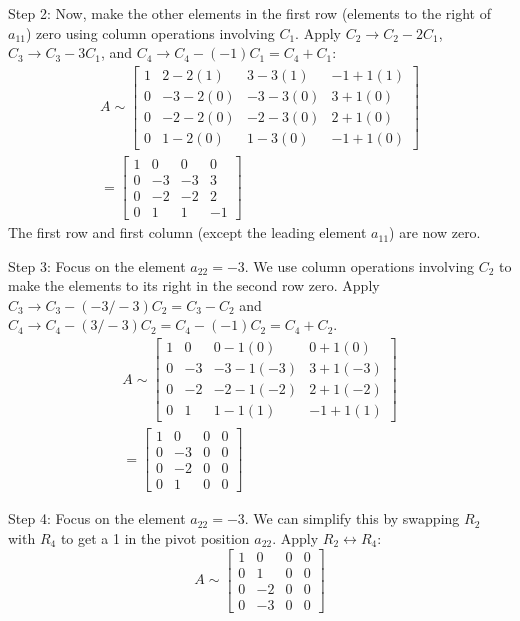 \documentclass{article}
\begin{document}
Step 2: Now, make the other elements in the first row (elements to the right of $a_{11}$) zero using column operations involving $C_1$.
Apply $C_2 \to C_2 - 2C_1$, $C_3 \to C_3 - 3C_1$, and $C_4 \to C_4 - (-1)C_1 = C_4 + C_1$:
\begin{align*} A \sim \begin{bmatrix} 1 & 2 - 2(1) & 3 - 3(1) & -1 + 1(1) \\ 0 & -3 - 2(0) & -3 - 3(0) & 3 + 1(0) \\ 0 & -2 - 2(0) & -2 - 3(0) & 2 + 1(0) \\ 0 & 1 - 2(0) & 1 - 3(0) & -1 + 1(0) \end{bmatrix} \\ = \begin{bmatrix} 1 & 0 & 0 & 0 \\ 0 & -3 & -3 & 3 \\ 0 & -2 & -2 & 2 \\ 0 & 1 & 1 & -1 \end{bmatrix}\end{align*}
The first row and first column (except the leading element $a_{11}$) are now zero.

Step 3: Focus on the element $a_{22} = -3$. We use column operations involving $C_2$ to make the elements to its right in the second row zero.
Apply $C_3 \to C_3 - (-3/-3)C_2 = C_3 - C_2$ and $C_4 \to C_4 - (3/-3)C_2 = C_4 - (-1)C_2 = C_4 + C_2$.
\begin{align*} A \sim \begin{bmatrix} 1 & 0 & 0 - 1(0) & 0 + 1(0) \\ 0 & -3 & -3 - 1(-3) & 3 + 1(-3) \\ 0 & -2 & -2 - 1(-2) & 2 + 1(-2) \\ 0 & 1 & 1 - 1(1) & -1 + 1(1) \end{bmatrix} \\ = \begin{bmatrix} 1 & 0 & 0 & 0 \\ 0 & -3 & 0 & 0 \\ 0 & -2 & 0 & 0 \\ 0 & 1 & 0 & 0 \end{bmatrix}\end{align*}

Step 4: Focus on the element $a_{22} = -3$. We can simplify this by swapping $R_2$ with $R_4$ to get a 1 in the pivot position $a_{22}$.
Apply $R_2 \leftrightarrow R_4$:
\[ A \sim \begin{bmatrix} 1 & 0 & 0 & 0 \\ 0 & 1 & 0 & 0 \\ 0 & -2 & 0 & 0 \\ 0 & -3 & 0 & 0 \end{bmatrix} \]
\end{document}
